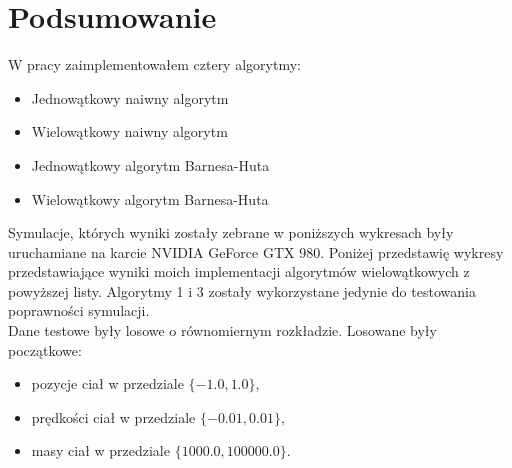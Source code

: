 \documentclass[14pt,twoside,a4paper]{article}
\theoremstyle{definition}
\begin{document}
\newpage

\section{\LARGE Podsumowanie}

W pracy zaimplementowałem cztery algorytmy:
\begin{itemize}
\item Jednowątkowy naiwny algorytm 
\item Wielowątkowy naiwny algorytm 
\item Jednowątkowy algorytm Barnesa-Huta
\item Wielowątkowy algorytm Barnesa-Huta
\end{itemize}

Symulacje, których wyniki zostały zebrane w poniższych wykresach były uruchamiane na karcie NVIDIA GeForce GTX 980. Poniżej przedstawię wykresy przedstawiające wyniki moich implementacji algorytmów wielowątkowych z powyższej listy. Algorytmy 1 i 3 zostały wykorzystane jedynie do testowania poprawności symulacji. \\
Dane testowe były losowe o równomiernym rozkładzie. Losowane były początkowe:
\begin{itemize}
\item pozycje ciał w przedziale $\{-1.0, 1.0\}$,
\item prędkości ciał w przedziale $\{-0.01, 0.01\}$,
\item masy ciał w przedziale $\{1000.0, 100000.0\}$.
\end{itemize}
\end{document}
